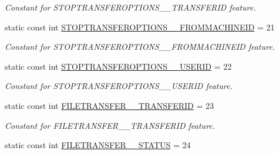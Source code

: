 \begin{DoxyCompactItemize}
\begin{DoxyCompactList}\small\item\em Constant for STOPTRANSFEROPTIONS\_\-\_\-TRANSFERID feature. \item\end{DoxyCompactList}\item 
\hypertarget{classFMS__Data_1_1FMS__DataPackage_a84512be3f302a9ed8bb0efc650b82d55}{
static const int \hyperlink{classFMS__Data_1_1FMS__DataPackage_a84512be3f302a9ed8bb0efc650b82d55}{STOPTRANSFEROPTIONS\_\-\_\-FROMMACHINEID} = 21}
\label{classFMS__Data_1_1FMS__DataPackage_a84512be3f302a9ed8bb0efc650b82d55}

\begin{DoxyCompactList}\small\item\em Constant for STOPTRANSFEROPTIONS\_\-\_\-FROMMACHINEID feature. \item\end{DoxyCompactList}\item 
\hypertarget{classFMS__Data_1_1FMS__DataPackage_ad458b2f813f9471e1603eb4623f3fe7e}{
static const int \hyperlink{classFMS__Data_1_1FMS__DataPackage_ad458b2f813f9471e1603eb4623f3fe7e}{STOPTRANSFEROPTIONS\_\-\_\-USERID} = 22}
\label{classFMS__Data_1_1FMS__DataPackage_ad458b2f813f9471e1603eb4623f3fe7e}

\begin{DoxyCompactList}\small\item\em Constant for STOPTRANSFEROPTIONS\_\-\_\-USERID feature. \item\end{DoxyCompactList}\item 
\hypertarget{classFMS__Data_1_1FMS__DataPackage_ad61948812983ba684152edbbe49e2391}{
static const int \hyperlink{classFMS__Data_1_1FMS__DataPackage_ad61948812983ba684152edbbe49e2391}{FILETRANSFER\_\-\_\-TRANSFERID} = 23}
\label{classFMS__Data_1_1FMS__DataPackage_ad61948812983ba684152edbbe49e2391}

\begin{DoxyCompactList}\small\item\em Constant for FILETRANSFER\_\-\_\-TRANSFERID feature. \item\end{DoxyCompactList}\item 
\hypertarget{classFMS__Data_1_1FMS__DataPackage_a493eab580e30301bf13fca7a32e7e9cd}{
static const int \hyperlink{classFMS__Data_1_1FMS__DataPackage_a493eab580e30301bf13fca7a32e7e9cd}{FILETRANSFER\_\-\_\-STATUS} = 24}
\label{classFMS__Data_1_1FMS__DataPackage_a493eab580e30301bf13fca7a32e7e9cd}


\end{DoxyCompactItemize}
